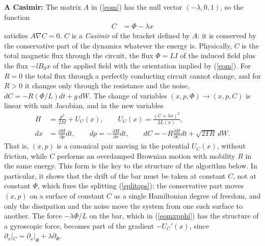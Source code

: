 \documentclass[11pt]{article}
\begin{document}
{\bf A Casimir:} The matrix $A$ in (\ref{eom}) has the null vector $(-\lambda,0,1)$, so the function
\begin{align}
  C&=\Phi-\lambda x
  \label{casimir}
\end{align}
satisfies $A\nabla C=0$. $C$ is a {\it Casimir} of the bracket defined by $A$: it is conserved by the conservative part of the dynamics whatever the energy is. Physically, $C$ is the total magnetic flux through the circuit, the flux $\Phi=LI$ of the induced field plus the flux $-lB_0x$ of the applied field with the orientation implied by (\ref{eom}). For $R=0$ the total flux through a perfectly conducting circuit cannot change, and for $R>0$ it changes only through the resistance and the noise, $dC=-R(\Phi/L)dt+g\,dW$. The change of variables $(x,p,\Phi)\to(x,p,C)$ is linear with unit Jacobian, and in the new variables
\begin{align}
  H&=\frac{p^2}{2M}+U_C(x),\qquad U_C(x)=\frac{(C+\lambda x)^2}{2L(x)},\nonumber\\
  dx&=\frac{\partial H}{\partial p}dt,\qquad dp=-\frac{\partial H}{\partial x}dt,\qquad dC=-R\frac{\partial H}{\partial C}dt+\sqrt{2TR}\,dW.
  \label{xpc}
\end{align}
That is, $(x,p)$ is a canonical pair moving in the potential $U_C(x)$, without friction, while $C$ performs an overdamped Brownian motion with mobility $R$ in the same energy. This form is the key to the structure of the algorithm below. In particular, it shows that the drift of the bar must be taken at constant $C$, not at constant $\Phi$, which fixes the splitting (\ref{splitops}): the conservative part moves $(x,p)$ on a surface of constant $C$ as a single Hamiltonian degree of freedom, and only the dissipation and the noise move the system from one such surface to another. The force $-\lambda\Phi/L$ on the bar, which in (\ref{eomxpphi}) has the structure of a gyroscopic force, becomes part of the gradient $-U_C'(x)$, since $\partial_x|_C=\partial_x|_\Phi+\lambda\partial_\Phi$.
\end{document}
